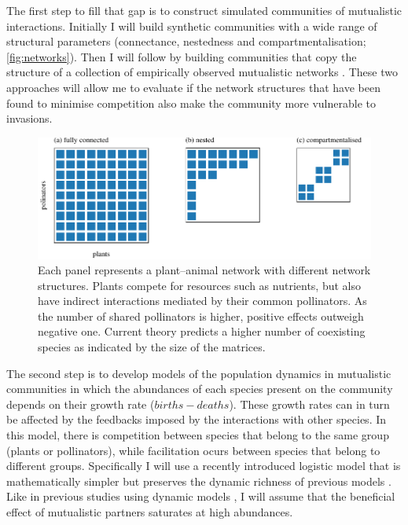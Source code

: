 \documentclass[a4paper]{article}
\begin{document}
The first step to fill that gap is to construct simulated communities of mutualistic interactions.
Initially I will build synthetic communities with a wide range of structural parameters (connectance, nestedness and compartmentalisation; \autoref{fig:networks}).
Then I will follow by building communities that copy the structure of a collection of empirically observed mutualistic networks \autocite{Stouffer2014}.
These two approaches will allow me to evaluate if the network structures that have been found to minimise competition also make the community more vulnerable to invasions.

\begin{figure}[tbp]
  \includegraphics{networks}
  \caption{
  \label{fig:networks}
  Each panel represents a plant–animal network with different network structures.
  Plants compete for resources such as nutrients, but also have indirect interactions mediated by their common pollinators.
  As the number of shared pollinators is higher, positive effects outweigh negative one.
  Current theory predicts a higher number of coexisting species as indicated by the size of the matrices.
  }
\end{figure}

The second step is to develop models of the population dynamics in mutualistic communities in which the abundances of each species present on the community depends on their growth rate ($births - deaths$).
These growth rates can in turn be affected by the feedbacks imposed by the interactions with other species.
In this model, there is competition between species that belong to the same group (plants or pollinators), while facilitation ocurs between species that belong to different groups.
Specifically I will use a recently introduced logistic model that is mathematically simpler but preserves the dynamic richness of previous models \autocite{Garcia-Algarra2013}.
Like in previous studies using dynamic models \autocite{Okuyama2008, Bastolla2009}, I will assume that the beneficial effect of mutualistic partners saturates at high abundances.
\end{document}
